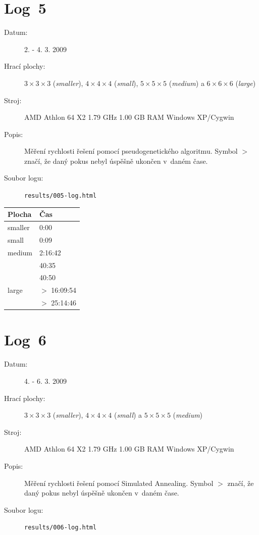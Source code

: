 \documentclass[11pt, titlepage]{report}
\begin{document}
\newpage

\section{Log~5}
\label{log5}

\begin{description}
\item[Datum:] 2. - 4. 3. 2009
\item[Hrací plochy:] $3 \times 3 \times 3$ (\emph{smaller}), $4 \times 4 \times 4$ (\emph{small}), $5 \times 5 \times 5$ (\emph{medium}) a $6 \times 6 \times 6$ (\emph{large})
\item[Stroj:] AMD Athlon 64 X2 1.79 GHz 1.00 GB RAM Windows XP/Cygwin
\item[Popis:] Měření rychlosti řešení pomocí pseudogenetického algoritmu. Symbol $>$ značí, že daný pokus nebyl úspěšně ukončen v~daném čase.
\item[Soubor logu:] \texttt{results/005-log.html}
\end{description}

\begin{tabular}{|l|l|}
\hline
\textbf{Plocha} & \textbf{Čas} \\
\hline
smaller & 0:00 \\
small & 0:09 \\
medium & 2:16:42 \\
& 40:35 \\
& 40:50 \\
large & $>$ 16:09:54 \\
& $>$ 25:14:46 \\
\hline
\end{tabular}


\section{Log~6}
\label{log6}

\begin{description}
\item[Datum:] 4. - 6. 3. 2009
\item[Hrací plochy:] $3 \times 3 \times 3$ (\emph{smaller}), $4 \times 4 \times 4$ (\emph{small}) a $5 \times 5 \times 5$ (\emph{medium})
\item[Stroj:] AMD Athlon 64 X2 1.79 GHz 1.00 GB RAM Windows XP/Cygwin
\item[Popis:] Měření rychlosti řešení pomocí Simulated Annealing. Symbol $>$ značí, že daný pokus nebyl úspěšně ukončen v~daném čase.
\item[Soubor logu:] \texttt{results/006-log.html}
\end{description}
\end{document}
